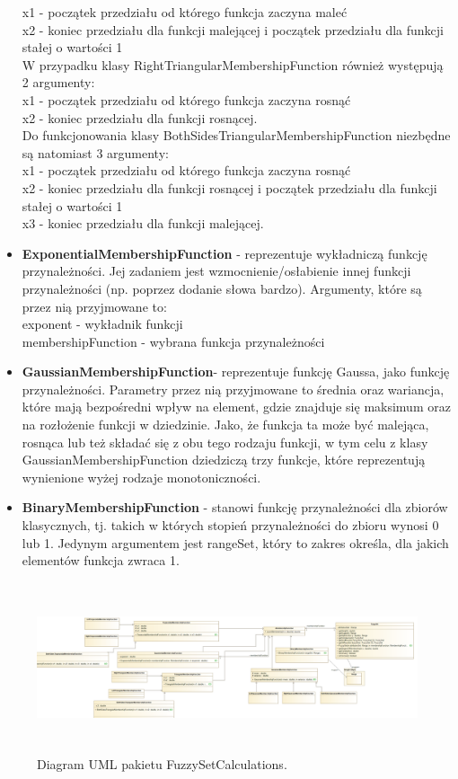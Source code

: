 \documentclass{classrep}
\begin{document}
\begin{itemize}
    x1 - początek przedziału od którego funkcja zaczyna maleć \\
    x2 - koniec przedziału dla funkcji malejącej i początek przedziału dla funkcji stałej o wartości 1 \\
    W przypadku klasy RightTriangularMembershipFunction również występują 2 argumenty:\\
    x1 - początek przedziału od którego funkcja zaczyna rosnąć \\
    x2 - koniec przedziału dla funkcji rosnącej. \\
    Do funkcjonowania klasy BothSidesTriangularMembershipFunction niezbędne są natomiast 3 argumenty: \\
    x1 - początek przedziału od którego funkcja zaczyna rosnąć \\
    x2 - koniec przedziału dla funkcji rosnącej i początek przedziału dla funkcji stałej o wartości 1 \\
    x3 - koniec przedziału dla funkcji malejącej.
    \item {\bf ExponentialMembershipFunction} - reprezentuje wykładniczą funkcję przynależności. Jej zadaniem jest wzmocnienie/osłabienie innej funkcji przynależności (np. poprzez dodanie słowa bardzo). Argumenty, które są przez nią przyjmowane to: \\
    exponent - wykładnik funkcji \\
    membershipFunction - wybrana funkcja przynależności 
    \item {\bf GaussianMembershipFunction}- reprezentuje funkcję Gaussa, jako funkcję przynależności. Parametry przez nią przyjmowane to średnia oraz wariancja, które mają bezpośredni wpływ na element, gdzie znajduje się maksimum oraz na rozłożenie funkcji w dziedzinie. Jako, że funkcja ta może być malejąca, rosnąca lub też składać się z obu tego rodzaju funkcji, w tym celu z klasy GaussianMembershipFunction dziedziczą trzy funkcje, które reprezentują wynienione wyżej rodzaje monotoniczności.
    \item {\bf BinaryMembershipFunction} - stanowi funkcję przynależności dla zbiorów klasycznych, tj. takich w których stopień przynależności do zbioru wynosi 0 lub 1. Jedynym argumentem jest rangeSet, który to zakres określa, dla jakich elementów funkcja zwraca 1.
\end{itemize}
\begin{figure}[H]
    \centering
    \includegraphics[width=14cm, height=5cm]{fuzzy_set_calculations.png}
    \caption{Diagram UML pakietu FuzzySetCalculations.}
    \label{rysunek:kwantyfikator_relatywny}
\end{figure}
\end{document}
